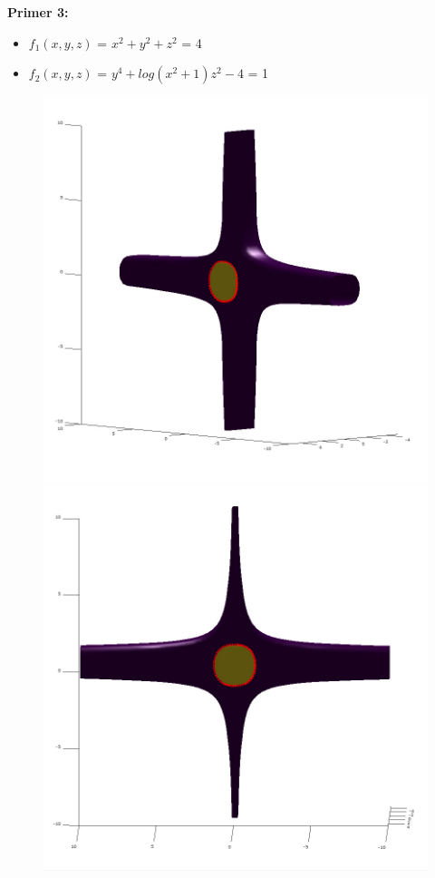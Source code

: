 \documentclass[12pt]{article}
\begin{document}
	\begin{minipage}{\textwidth}
		\textbf{\large{Primer 3:}}
		\begin{itemize}  
			\item $f_{1}(x,y,z)$ = $x^2 + y^2 + z^2$ = 4
			\item $f_{2}(x,y,z)$ = $y^4 + log(x^2 + 1)z^2 - 4$ = 1
		\end{itemize}
		\begin{figure}[H]
			\centering
			\includegraphics[scale=0.3]{primer3_1}
			\includegraphics[scale=0.3]{primer3_2}
		\end{figure}
	\end{minipage}
	
\end{document}
